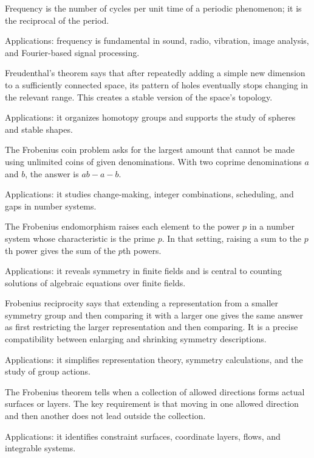 Frequency is the number of cycles per unit time of a periodic phenomenon; it is the reciprocal of the period. \par\noindent Applications: frequency is fundamental in sound, radio, vibration, image analysis, and Fourier-based signal processing.

Freudenthal's theorem says that after repeatedly adding a simple new dimension to a sufficiently connected space, its pattern of holes eventually stops changing in the relevant range. This creates a stable version of the space's topology. \par\noindent Applications: it organizes homotopy groups and supports the study of spheres and stable shapes.

The Frobenius coin problem asks for the largest amount that cannot be made using unlimited coins of given denominations. With two coprime denominations $a$ and $b$, the answer is $ab-a-b$. \par\noindent Applications: it studies change-making, integer combinations, scheduling, and gaps in number systems.

The Frobenius endomorphism raises each element to the power $p$ in a number system whose characteristic is the prime $p$. In that setting, raising a sum to the $p$th power gives the sum of the $p$th powers. \par\noindent Applications: it reveals symmetry in finite fields and is central to counting solutions of algebraic equations over finite fields.

Frobenius reciprocity says that extending a representation from a smaller symmetry group and then comparing it with a larger one gives the same answer as first restricting the larger representation and then comparing. It is a precise compatibility between enlarging and shrinking symmetry descriptions. \par\noindent Applications: it simplifies representation theory, symmetry calculations, and the study of group actions.

The Frobenius theorem tells when a collection of allowed directions forms actual surfaces or layers. The key requirement is that moving in one allowed direction and then another does not lead outside the collection. \par\noindent Applications: it identifies constraint surfaces, coordinate layers, flows, and integrable systems.

